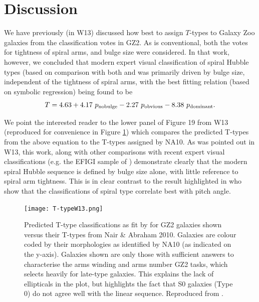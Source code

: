 \documentclass[usenatbib]{mn2e}
\newcommand{\be}{\begin{equation}}
\newcommand{\ee}{\end{equation}}
\begin{document}
\section{Discussion} \label{discussion}

 
 We have previously (in W13) discussed how best to assign $T$-types to Galaxy Zoo galaxies from the classification votes in GZ2. As is conventional, both the votes for tightness of spiral arms, and bulge size were considered. In that work, however, we concluded that modern expert visual classification of spiral Hubble types (based on comparison with both \citet[hereafter NA10]{Nair2010a} and \citet{EFIGI} was primarily driven by bulge size, independent of the tightness of spiral arms, with the best fitting relation (based on symbolic regression) being found to be
 \be
 T = 4.63 + 4.17~p_{\rm no bulge} - 2.27~p_{\rm obvious} - 8.38~p_{\rm dominant}. 
 \ee 
 
We point the interested reader to the lower panel of Figure 19 from W13 (reproduced for convenience in Figure \ref{T-type}) which compares the predicted T-types from the above equation to the T-types assigned by NA10. As was pointed out in W13, this work, along with other comparisons with recent expert visual classifications (e.g. the EFIGI sample of \citealt{EFIGI}) demonstrate clearly that the modern spiral Hubble sequence is defined by bulge size alone, with little reference to spiral arm tightness. This is in clear contrast to the result highlighted in \citet{kennicutt1981} who show that the \citet{sandagetammann1981} classifications of spiral type correlate best with pitch angle. 


\begin{figure}
\texttt{[image: T-typeW13.png]}
\caption{Predicted T-type classifications as fit by \citet{Willett2013} for GZ2 galaxies shown versus their T-types from Nair \& Abraham 2010. Galaxies are colour coded by their morphologies as identified by NA10 (as indicated on the y-axis). Galaxies shown are only those with sufficient answers to characterise the arms winding and arms number GZ2 tasks, which selects heavily for late-type galaxies. This explains the lack of ellipticals in the plot, but highlights the fact that S0 galaxies (Type 0) do not agree well with the linear sequence. Reproduced from \citet{Willett2013}.  \label{T-type}}
\end{figure}
\end{document}
